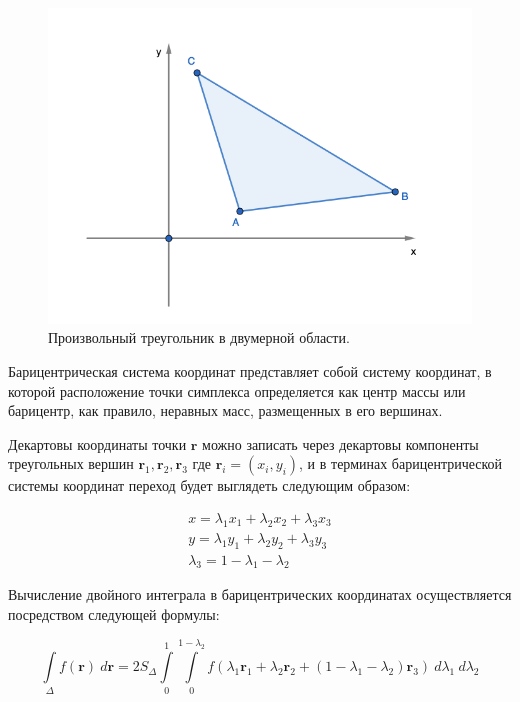 \documentclass[14pt]{extreport}
\begin{document}
\begin{figure}[H]
\centerline{
\includegraphics[width=0.8\linewidth]{images/triangle}}
\caption{Произвольный треугольник в двумерной области.}
\label{img:integrate:triangle}
\end{figure}

Барицентрическая система координат представляет собой систему координат, в которой расположение точки симплекса определяется как центр массы или барицентр, как правило, неравных масс, размещенных в его вершинах. 

Декартовы координаты точки $\mathbf{r}$ можно записать через декартовы компоненты треугольных вершин $\mathbf{r}_1, \mathbf{r}_2, \mathbf{r}_3$ где $\mathbf{r}_i = (x_i, y_i)$, и в терминах барицентрической системы координат переход будет выглядеть следующим образом:

\begin{eqnarray}
x = \lambda_{1} x_{1} +  \lambda_{2} x_{2} +  \lambda_{3} x_{3} \\
y = \lambda_{1} y_{1} +  \lambda_{2} y_{2} +  \lambda_{3} y_{3} \\
\lambda_{3} = 1 - \lambda_{1} - \lambda_{2}
\end{eqnarray}

Вычисление двойного интеграла в барицентрических координатах осуществляется посредством следующей формулы\cite{bib:calc:barycentric}:

\begin{equation}
\int\limits_{\Delta} f(\mathbf{r}) \ d\mathbf{r} = 2S_{\Delta} \int\limits_{0}^{1} \int\limits_{0}^{1 - \lambda_{2}} f(\lambda_{1} \mathbf{r}_{1} + \lambda_{2} \mathbf{r}_{2} +
(1 - \lambda_{1} - \lambda_{2}) \mathbf{r}_{3}) \ d\lambda_{1} \ d\lambda_{2}
\end{equation}
\end{document}
